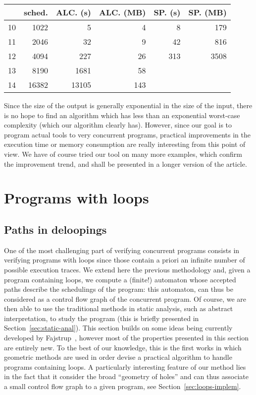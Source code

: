 \documentclass[orivec]{llncs} \usepackage[T1]{fontenc}
\begin{document}
\begin{center}
  \begin{tabular}{r|r|r|r|r|r}
    &sched.& ALC. (s)&ALC. (MB)&SP. (s)&SP. (MB)\\
    \hline
10&1022&5&4&8&179\\
    11&2046&32&9&42&816\\
    12&4094&227&26&313&3508\\
    13&8190&1681&58&&\\
    14&16382&13105&143&&\\
  \end{tabular}
\end{center}



Since the size of the output is generally exponential in the size of the input,
there is no hope to find an algorithm which has less than an exponential
worst-case complexity (which our algorithm clearly has). However, since our goal
is to program actual tools to very concurrent programs, practical improvements
in the execution time or memory consumption are really interesting from this
point of view. We have of course tried our tool on many more examples, which
confirm the improvement trend, and shall be presented in a longer version of the
article.





\section{Programs with loops}
\label{programswithloops}
\subsection{Paths in deloopings}
One of the most challenging part of verifying concurrent programs consists in
verifying programs with loops since those contain a priori an infinite number of
possible execution traces. We extend here the previous methodology and, given a
program containing loops, we compute a (finite!) automaton whose accepted paths
describe the schedulings of the program: this automaton, can thus be considered
as a control flow graph of the concurrent program. Of course, we are then able
to use the traditional methods in static analysis, such as abstract
interpretation, to study the program (this is briefly presented in
Section~\ref{sec:static-anal}). This section builds on some ideas being
currently developed by Fajstrup~\cite{LF2011}, however most of the properties
presented in this section are entirely new. To the best of our knowledge, this
is the first works in which geometric methods are used in order devise a
practical algorithm to handle programs containing loops. A particularly
interesting feature of our method lies in the fact that it consider the broad
``geometry of holes'' and can thus associate a small control flow graph to a
given program, see Section~\ref{sec:loops-implem}.
\end{document}
